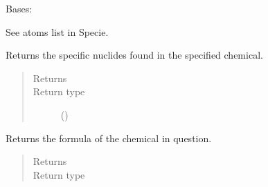 \documentclass[letterpaper,10pt,openany,oneside,english]{sphinxmanual}
\begin{document}
\begin{fulllineitems}
\label{\detokenize{support_rst/actor:actor.Actor}}
Bases: 

See atoms list in Specie.

\begin{fulllineitems}
\label{\detokenize{support_rst/actor:actor.Actor.atoms}}
Returns the specific nuclides found in the specified chemical.
\begin{quote}\begin{description}
\item[{Returns}] \leavevmode
{}

\item[{Return type}] \leavevmode
{}()

\end{description}\end{quote}

\end{fulllineitems}


\begin{fulllineitems}
\label{\detokenize{support_rst/actor:actor.Actor.formula}}
Returns the formula of the chemical in question.
\begin{quote}\begin{description}
\item[{Returns}] \leavevmode
{}

\item[{Return type}] \leavevmode
{}

\end{description}\end{quote}

\end{fulllineitems}


\end{fulllineitems}
\end{document}
